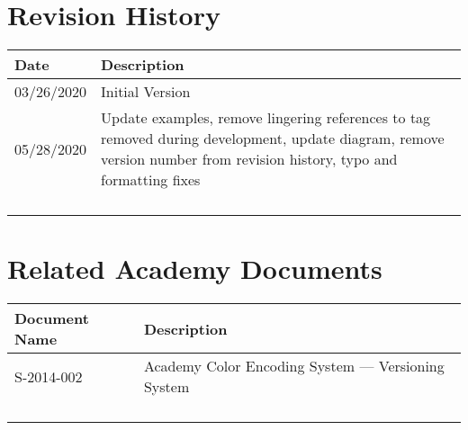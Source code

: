 \prelimsectionformat	%
\chapter{Revision History}

\begin{tabularx}{\linewidth}{|l|X|}
    \hline
    Date       & Description \\ \hline
    03/26/2020 & Initial Version \\ \hline
    05/28/2020 & Update examples, remove lingering references to tag removed during development, update diagram, remove version number from revision history, typo and formatting fixes \\ \hline
	&	\\ \hline
    &	\\ \hline
    &	\\ \hline
    &	\\ \hline
\end{tabularx}

\vspace{0.25in} %
\chapter{Related Academy Documents} %
\begin{tabularx}{\linewidth}{|l|X|}
    \hline
    Document Name & Description \\ \hline
    S-2014-002 & Academy Color Encoding System --- Versioning System\\ \hline
    & \\ \hline
    & \\ \hline
    & \\ \hline
    & \\ \hline
\end{tabularx}